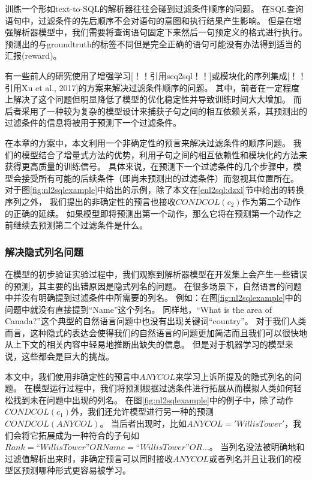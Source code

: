 训练一个形如text-to-SQL的解析器往往会碰到过滤条件顺序的问题。
在SQL查询语句中，过滤条件的先后顺序不会对语句的意图和执行结果产生影响。
但是在增强解析器模型中，我们需要将查询语句固定下来然后一句预定义的格式进行执行。
预测出的与groundtruth的标签不同但是完全正确的语句可能没有办法得到适当的汇报(reward)。

有一些前人的研究使用了增强学习[！！引用seq2sql！！]或模块化的序列集成[！！引用Xu et al., 2017]的方案来解决过滤条件顺序的问题。
其中，前者在一定程度上解决了这个问题但明显降低了模型的优化稳定性并导致训练时间大大增加。
而后者采用了一种较为复杂的模型设计来捕获子句之间的相互依赖关系，其预测出的过滤条件的信息将被用于预测下一个过滤条件。

在本章的方案中，本文利用一个非确定性的预言来解决过滤条件的顺序问题。
我们的模型结合了增量式方法的优势，利用子句之间的相互依赖性和模块化的方法来获得更高质量的训练信号。
具体来说，在预测下一个过滤条件的几个步骤中，模型会接受所有可能的后续条件（即尚未预测出的过滤条件）而忽视其位置所在。
对于图\ref{fig:nl2sqlexample}中给出的示例，除了本文在\ref{enl2sql:dzxl}节中给出的转换序列之外，
我们提出的非确定性的预言也接收$CONDCOL(c_2)$作为第二个动作的正确的延续。
如果模型即将预测出第一个动作，那么它将在预测第一个动作之前继续去预测第二个过滤条件是什么。
\subsubsection{解决隐式列名问题}
\label{enl2sql:icn}
在模型的初步验证实验过程中，我们观察到解析器模型在开发集上会产生一些错误的预测，其主要的出错原因是隐式列名的问题。
在很多场景下，自然语言的问题中并没有明确提到过滤条件中所需要的列名。
例如：在图\ref{fig:nl2sqlexample}中的问题中就没有直接提到“Name”这个列名。
同样地，“What is the area of Canada?”这个典型的自然语言问题中也没有出现关键词“country”。
对于我们人类而言，这种隐式的表达会使得我们的自然语言的问题更加简洁而且我们可以很快地从上下文的相关内容中轻易地推断出缺失的信息。
但是对于机器学习的模型来说，这些都会是巨大的挑战。

本文中，我们使用非确定性的预言中$ANYCOL$来学习上诉所提及的隐式列名的问题。
在模型运行过程中，我们将预测根据过滤条件进行拓展从而模拟人类如何轻松找到未在问题中出现的列名。
在图\ref{fig:nl2sqlexample}中的例子中，除了动作$CONDCOL(c_1)$外，我们还允许模型进行另一种的预测$CONDCOL(ANYCOL)$。
当后者出现时，比如$ANYCOL='Willis Tower'$，我们会将它拓展成为一种符合的子句如$Rank=“Willis Tower” OR Name=“Willis Tower” OR ...$。
当列名没法被明确地和过滤值解析出来时，非确定预言可以同时接收$ANYCOL$或者列名并且让我们的模型区预测哪种形式更容易被学习。




